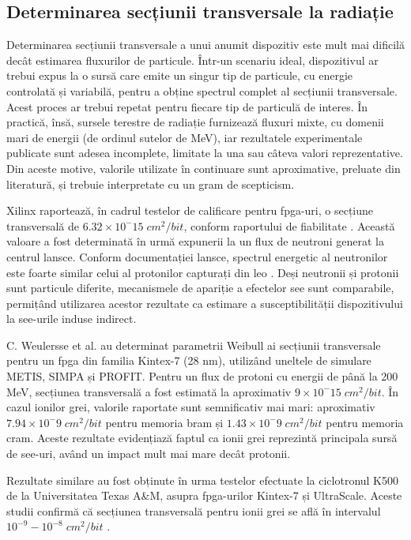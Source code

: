 \documentclass[12pt,a4paper]{report}
\begin{document}
\subsection{Determinarea secțiunii transversale la radiație}
Determinarea secțiunii transversale a unui anumit dispozitiv este mult mai dificilă decât estimarea fluxurilor de particule. Într-un scenariu ideal, dispozitivul ar trebui expus la o sursă care emite un singur tip de particule, cu energie controlată și variabilă, pentru a obține spectrul complet al secțiunii transversale. Acest proces ar trebui repetat pentru fiecare tip de particulă de interes. În practică, însă, sursele terestre de radiație furnizează fluxuri mixte, cu domenii mari de energii (de ordinul sutelor de MeV), iar rezultatele experimentale publicate sunt adesea incomplete, limitate la una sau câteva valori reprezentative. Din aceste motive, valorile utilizate în continuare sunt aproximative, preluate din literatură, și trebuie interpretate cu un gram de scepticism.

Xilinx raportează, în cadrul testelor de calificare pentru \gls{fpga}-uri, o secțiune transversală de \(6.32 \times 10^-15 \; cm^2/bit\), conform raportului de fiabilitate \cite{amd_reliability_report}. Această valoare a fost determinată în urmă expunerii la un flux de neutroni generat la centrul \acrfull{lansce}. Conform documentației \gls{lansce}, spectrul energetic al neutronilor este foarte similar celui al protonilor capturați din \gls{leo} \cite{lansce_ice2}. Deși neutronii și protonii sunt particule diferite, mecanismele de apariție a efectelor \gls{see} sunt comparabile, permițând utilizarea acestor rezultate ca estimare a susceptibilității dispozitivului la \gls{see}-urile induse indirect.

C. Weulersse et al. \cite{metis_cross_section_simulation} au determinat parametrii Weibull ai secțiunii transversale pentru un \gls{fpga} din familia Kintex-7 (28 nm), utilizând uneltele de simulare METIS, SIMPA și PROFIT. Pentru un flux de protoni cu energii de până la 200 MeV, secțiunea transversală a fost estimată la aproximativ \(9 \times 10^-15 \; cm^2/bit\). În cazul ionilor grei, valorile raportate sunt semnificativ mai mari: aproximativ \(7.94 \times 10^-9 \; cm^2/bit\) pentru memoria \gls{bram} și \(1.43 \times 10^-9 \; cm^2/bit\) pentru memoria \gls{cram}. Aceste rezultate evidențiază faptul ca ionii grei reprezintă principala sursă de  \gls{see}-uri, având un impact mult mai mare decât protonii.

Rezultate similare au fost obținute în urma testelor efectuate la ciclotronul K500 de la Universitatea Texas A\&M, asupra \gls{fpga}-urilor Kintex-7 și UltraScale. Aceste studii confirmă că secțiunea transversală pentru ionii grei se află în intervalul \(10^{-9} - 10^{-8} \; cm^2/bit\) \cite{texas_ion_testing_1, texas_ion_testing_2}.
\end{document}
